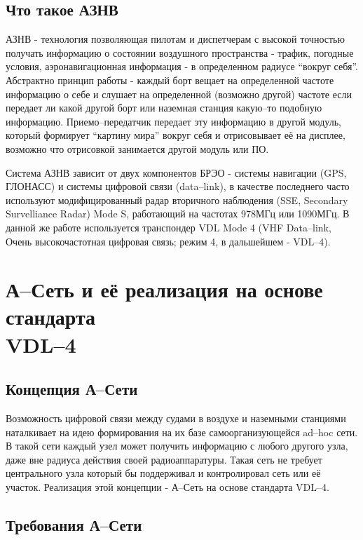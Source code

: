 \documentclass[a4paper,12pt]{report} %
\begin{document}
\section{Что такое АЗНВ}

АЗНВ - технология позволяющая пилотам и диспетчерам с высокой точностью получать
информацию о состоянии воздушного пространства - трафик, погодные условия,
аэронавигационная информация - в определенном радиусе ``вокруг себя''.
Абстрактно принцип работы - каждый борт вещает на определенной частоте информацию о себе и
слушает на определенной (возможно другой) частоте если передает ли какой другой
борт или наземная станция какую--то подобную информацию. Приемо--передатчик
передает эту информацию в другой модуль, который формирует ``картину мира''
вокруг себя и отрисовывает её на дисплее, возможно что отрисовкой занимается
другой модуль или ПО.

Система АЗНВ зависит от двух компонентов БРЭО - системы навигации (GPS, ГЛОНАСС)
и системы цифровой связи (data--link), в качестве последнего часто используют
модифицированный радар вторичного наблюдения (SSE, Secondary Survelliance Radar)
Mode S, работающий на частотах 978МГц или 1090МГц. В данной же работе
используется транспондер VDL Mode 4 (VHF Data--link, Очень высокочастотная цифровая
связь; режим 4, в дальшейшем - VDL--4).
\newpage

\chapter{А--Сеть и её реализация на основе стандарта \\
 VDL--4} %

\section{Концепция А--Сети}

Возможность цифровой связи между судами в воздухе и наземными станциями
наталкивает на идею формирования на их базе самоорганизующейся ad--hoc сети. В
такой сети каждый узел может получить информацию с любого другого узла, даже вне
радиуса действия своей радиоаппаратуры. Такая сеть не требует центрального узла
который бы поддерживал и контролировал сеть или её участок. Реализация этой
концепции - А--Сеть на основе стандарта VDL--4.

\section{Требования А--Сети}
\end{document}
